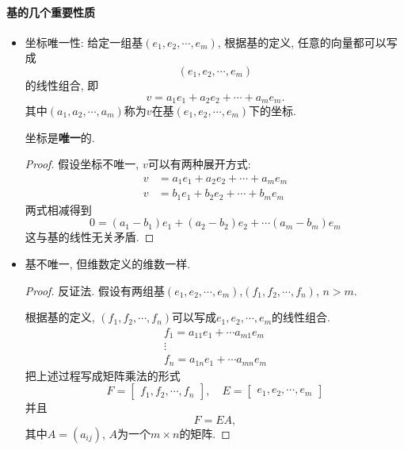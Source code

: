 \paragraph{基的几个重要性质}
\begin{itemize}
  \item 坐标唯一性: 给定一组基$(e_1,e_2,\cdots , e_m)$, 根据基的定义, 任意的向量都可以写成$$(e_1,e_2,\cdots , e_m)$$的线性组合, 即
  \begin{equation}
    v = a_1e_1+a_2e_2+ \cdots +a_m e_m.
  \end{equation}
  其中$(a_1,a_2,\cdots ,a_m)$称为$v$在基$(e_1,e_2,\cdots, e_m)$下的坐标.
  
  坐标是\textbf{唯一}的.
  \begin{proof}
      假设坐标不唯一, $v$可以有两种展开方式:
      \begin{equation}
        \begin{aligned}
          v & = a_1 e_1+a_2e_2+ \cdots +a_m e_m 
          \\
          v & = b_1 e_1+b_2e_2+ \cdots +b_m e_m 
        \end{aligned}
      \end{equation}
      两式相减得到
      \begin{equation}
        0 = (a_1-b_1)e_1+(a_2-b_2)e_2+ \cdots (a_m - b_m)e_m
      \end{equation}
      这与基的线性无关矛盾.
  \end{proof}

  \item 基不唯一, 但维数定义的维数一样.
  \begin{proof}
      反证法. 假设有两组基$(e_1,e_2,\cdots,e_m)$,$(f_1,f_2,\cdots,f_n)$, $n>m$.
       
      根据基的定义, $(f_1,f_2,\cdots,f_n)$可以写成$e_1,e_2,\cdots,e_m$的线性组合.
      \begin{equation}
        \begin{matrix}
          f_1 = a_{11}e_1
          + \cdots a_{m1} e_m
          \\
          \vdots
          \\
          f_n = a_{1n}e_1
          + \cdots a_{mn} e_m
        \end{matrix}
      \end{equation}
      把上述过程写成矩阵乘法的形式
      \begin{equation}
        F = \begin{bmatrix} f_1, f_2, \cdots, f_n \end{bmatrix},\quad E = \begin{bmatrix} e_1, e_2, \cdots, e_m \end{bmatrix}
      \end{equation}
      并且
      \begin{equation}
        F = EA,
      \end{equation}
      其中$A = (a_{ij})$, $A$为一个$m \times n$的矩阵.
  

\end{proof}
\end{itemize}
